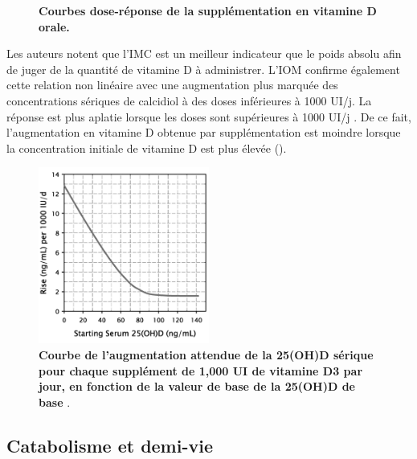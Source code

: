 \documentclass[
  a4paper,
  DIV=11,
  numbers=noendperiod,
  listof=totoc]{scrreprt}
\begin{document}
\begin{figure}[H]
\begin{subfigure}{0.48\textwidth}
        \label{subfig:vd-dose-imc}
    \end{subfigure}
    \caption[Courbes dose-réponse de la supplémentation en vitamine D orale.]{\textbf{Courbes dose-réponse de la supplémentation en vitamine D orale.}}
    \label{fig:dose-response}
\end{figure}

Les auteurs notent que l'\ac{IMC} est un meilleur indicateur que le
poids absolu afin de juger de la quantité de vitamine D à administrer.
L'\ac{IOM} confirme également cette relation non linéaire avec une
augmentation plus marquée des concentrations sériques de calcidiol à des
doses inférieures à 1000 UI/j. La réponse est plus aplatie lorsque les
doses sont supérieures à 1000 UI/j \autocite{IOM.2011,Garland.2011}. De
ce fait, l'augmentation en vitamine D obtenue par supplémentation est
moindre lorsque la concentration initiale de vitamine D est plus élevée
().

\begin{figure}[H]
\centering
\includegraphics[width=0.5\textwidth]{figures/vd-expected-rise.jpeg}
\caption[Courbe de l'augmentation attendue de la 25(OH)D sérique pour chaque supplément de 1,000 UI de vitamine D3 par jour, en fonction de la valeur de base de la 25(OH)D de base]{\textbf{Courbe de l'augmentation attendue de la 25(OH)D sérique pour chaque supplément de 1,000 UI de vitamine D3 par jour, en fonction de la valeur de base de la 25(OH)D de base} \autocite{Garland.2011}.}
\label{fig:vd-expected-rise}
\end{figure}

\subsection{Catabolisme et demi-vie}\label{catabolisme-et-demi-vie}
\end{document}
